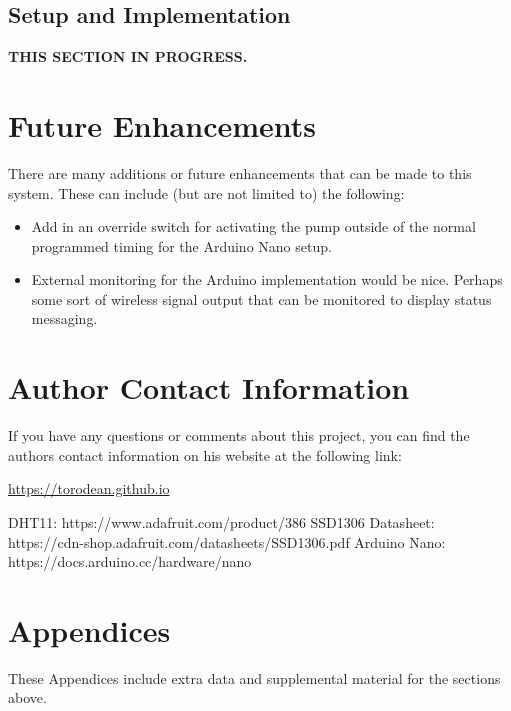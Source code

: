 \documentclass{article}
\begin{document}
\begin{multicols}{2}
			\subsection{Setup and Implementation}
			\textbf{THIS SECTION IN PROGRESS.}
		
		\section{Future Enhancements}
		There are many additions or future enhancements that can be made to this system. These can include (but are not limited to) the following:
		\begin{itemize}
			\item Add in an override switch for activating the pump outside of the normal programmed timing for the Arduino Nano setup.
			\item External monitoring for the Arduino implementation would be nice. Perhaps some sort of wireless signal output that can be monitored to display status messaging.
		\end{itemize}
		
		\section{Author Contact Information}
		
		If you have any questions or comments about this project, you can find the authors contact information on his website at the following link:
		
		\begin{mdframed}[backgroundcolor=gray!08, linewidth=1pt]
			\url{https://torodean.github.io}
		\end{mdframed}
		
	\end{multicols} %
	
	\begin{thebibliography}{X}
		 DHT11: https://www.adafruit.com/product/386
		 SSD1306 Datasheet: https://cdn-shop.adafruit.com/datasheets/SSD1306.pdf
		 Arduino Nano: https://docs.arduino.cc/hardware/nano
	\end{thebibliography}	
	
	\section{Appendices}
	These Appendices include extra data and supplemental material for the sections above.
	
\end{document}

